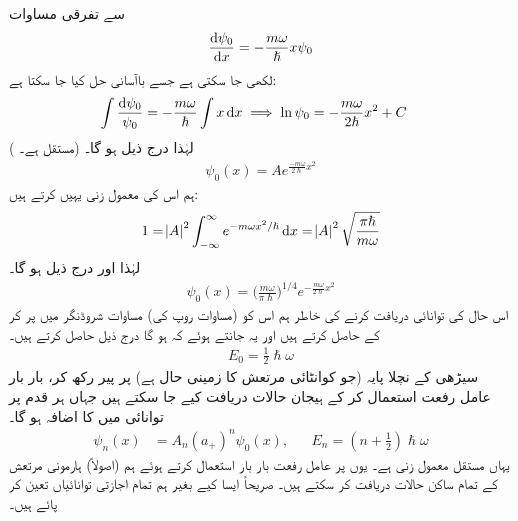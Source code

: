سے تفرقی مساوات
\begin{align*}
\frac{ \dif \psi_0}{\dif x } = -\frac{m \omega }{ \hslash } x \psi_0
\end{align*}
لکھی جا سکتی ہے جسے باآسانی حل کیا جا سکتا ہے: 
\begin{align*}
\int{\frac{ \dif \psi_0 }{ \psi_0 } } &= -\frac{ m \omega }{ \hslash } \int{ x \dif x } \implies \ln \psi_0 = 
-\frac{m \omega }{ 2 \hslash } x^2 +C 
\end{align*} 
( مستقل ہے۔) لہٰذا درج ذیل ہو گا۔
\begin{align*}
\psi_0 (x) = A e^{\frac{ - m \omega }{ 2 \hslash } x^2}
\end{align*}
ہم اس کی معمول زنی یہیں کرتے ہیں: 
\begin{align*}
1 = \abs{A}^2 \int_{ - \infty}^{ \infty } e^{- m \omega x^2/ \hslash} \dif x = \abs{A}^2 \sqrt{ \frac{ \pi \hslash }{ m \omega }}
\end{align*}
لہٰذا  اور درج ذیل ہو گا۔
\\
\begin{align}\label{مساوات_شروڈنگر_معمول_شدہ_حال_صفر}
\psi_0 (x) = \big(\frac{ m \omega }{ \pi \hslash}\big)^{1/4} e^{-\frac{ m \omega }{ 2 \hslash} x^2}
\end{align}
اس حال کی توانائی دریافت کرنے کی خاطر ہم اس کو (مساوات  روپ کی) مساوات شروڈنگر میں پر کر کے  حاصل کرتے ہیں اور یہ جانتے ہوئے کہ  ہو گا درج ذیل حاصل کرتے ہیں۔
\begin{align}
 E_0 = \frac{1}{2} \hslash \omega 
\end{align}
سیڑھی کے نچلا پایہ (جو کوانٹائی مرتعش کا زمینی حال ہے) پر پیر رکھ کر، بار بار عامل رفعت استعمال کر کے ہیجان حالات دریافت کیے جا سکتے ہیں جہاں ہر قدم پر توانائی میں  کا اضافہ ہو گا۔
\begin{align}\label{مساوات_شروڈنگر_ہارمونی_حالات}
\psi_n (x) &= A_n ( a_+)^n \psi_0(x) , && E_n = ( n + \tfrac{1}{2}) \hslash \omega
\end{align}
یہاں  مستقل معمول زنی ہے۔ یوں  پر عامل رفعت بار بار استعمال کرتے ہوئے ہم (اصولاً) ہارمونی مرتعش کے تمام ساکن حالات دریافت کر سکتے ہیں۔ صریحاً ایسا کیے بغیر ہم تمام اجازتی توانائیاں تعین کر پائے ہیں۔


